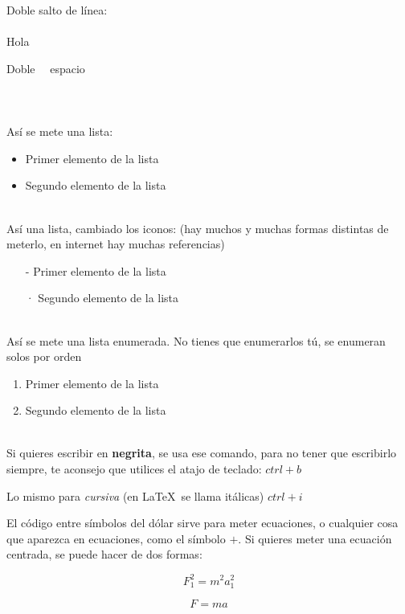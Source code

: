 \documentclass{article}
\begin{document}
Doble salto de línea:\\ \\


Hola


Doble  \ \  espacio \\ \\ \\ \\


Así se mete una lista:

\begin{itemize}
	\item Primer elemento de la lista
    \item Segundo elemento de la lista \\ \\ 
\end{itemize}

Así una lista, cambiado los iconos: (hay muchos y muchas formas distintas de meterlo, en internet hay muchas referencias)
\begin{itemize}
	\item[-] Primer elemento de la lista
    \item[·] Segundo elemento de la lista \\ \\ 
\end{itemize}

Así se mete una lista enumerada. No tienes que enumerarlos tú, se enumeran solos por orden
\begin{enumerate}
	\item Primer elemento de la lista
    \item Segundo elemento de la lista \\ \\  
\end{enumerate}


Si quieres escribir en \textbf{negrita}, se usa ese comando, para no tener que escribirlo siempre, te aconsejo que utilices el atajo de teclado: $ctrl+b$

Lo mismo para \textit{cursiva} (en \LaTeX \ se llama itálicas) $ctrl+i$

El código entre símbolos del dólar sirve para meter ecuaciones, o cualquier cosa que aparezca en ecuaciones, como el símbolo $ + $. Si quieres meter una ecuación centrada, se puede hacer de dos formas:

$$
F_{1}^2 = m^{2} a_{1}^{2}
$$

\begin{equation}
F = ma
\end{equation}
\end{document}
